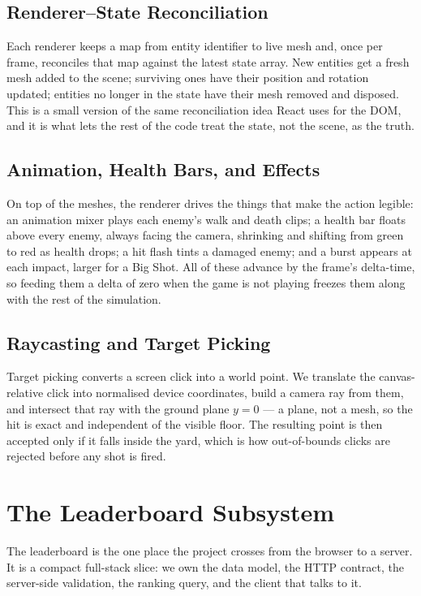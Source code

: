 \documentclass[12pt,a4paper]{report}
\begin{document}
\subsection{Renderer--State Reconciliation}

Each renderer keeps a map from entity identifier to live mesh and, once per
frame, reconciles that map against the latest state array. New entities get a
fresh mesh added to the scene; surviving ones have their position and rotation
updated; entities no longer in the state have their mesh removed and disposed.
This is a small version of the same reconciliation idea React uses for the DOM,
and it is what lets the rest of the code treat the state, not the scene, as the
truth.

\subsection{Animation, Health Bars, and Effects}

On top of the meshes, the renderer drives the things that make the action
legible: an animation mixer plays each enemy's walk and death clips; a health bar
floats above every enemy, always facing the camera, shrinking and shifting from
green to red as health drops; a hit flash tints a damaged enemy; and a burst
appears at each impact, larger for a Big Shot. All of these advance by the
frame's delta-time, so feeding them a delta of zero when the game is not playing
freezes them along with the rest of the simulation.

\subsection{Raycasting and Target Picking}

Target picking converts a screen click into a world point. We translate the
canvas-relative click into normalised device coordinates, build a camera ray
from them, and intersect that ray with the ground plane $y=0$ --- a plane, not a
mesh, so the hit is exact and independent of the visible floor. The resulting
point is then accepted only if it falls inside the yard, which is how
out-of-bounds clicks are rejected before any shot is fired.

\section{The Leaderboard Subsystem}

The leaderboard is the one place the project crosses from the browser to a
server. It is a compact full-stack slice: we own the data model, the HTTP
contract, the server-side validation, the ranking query, and the client that
talks to it.
\end{document}
